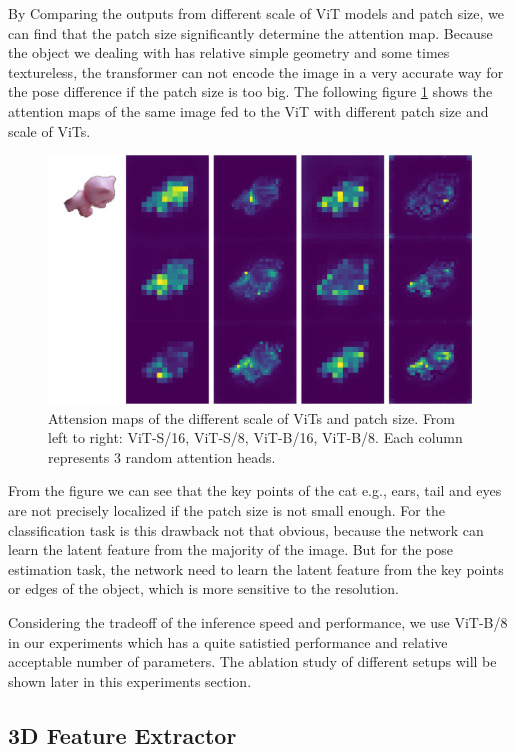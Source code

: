 \documentclass[12pt,DIV14,BCOR12mm,a4paper,footinclude=false,headinclude,parskip=half-,twoside,openright,cleardoublepage=empty,toc=index,bibliography=totoc,listof=totoc]{scrreprt}
\numberwithin{equation}{chapter}
\begin{document}
By Comparing the outputs from different scale of ViT models and patch size, we can find that the patch size significantly determine the attention map. Because the object we dealing with has relative simple geometry and some times textureless, the transformer can not encode the image in a very accurate way for the pose difference if the patch size is too big. The following figure \ref{img:atten_patch} shows the attention maps of the same image fed to the ViT with different patch size and scale of ViTs. 
\begin{figure}[h]
	\centering
	\includegraphics[scale=.65]{img/atten_cat.png}
	\caption{Attension maps of the different scale of ViTs and patch size. From left to right: ViT-S/16, ViT-S/8, ViT-B/16, ViT-B/8. Each column represents 3 random attention heads.}
	\label{img:atten_patch}
\end{figure}

From the figure we can see that the key points of the cat e.g., ears, tail and eyes are not precisely localized if the patch size is not small enough. For the classification task is this drawback not that obvious, because the network can learn the latent feature from the majority of the image. But for the pose estimation task, the network need to learn the latent feature from the key points or edges of the object, which is more sensitive to the resolution.

Considering the tradeoff of the inference speed and performance, we use ViT-B/8 in our experiments which has a quite satistied performance and relative acceptable number of parameters. The ablation study of different setups will be shown later in this experiments section.

\subsection{3D Feature Extractor}
\end{document}
